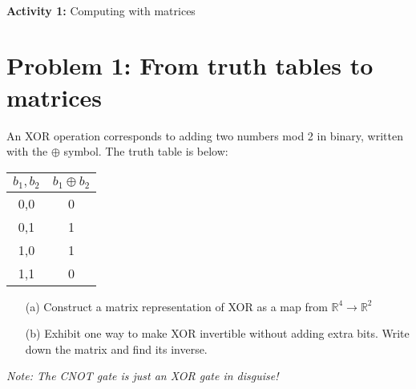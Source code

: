 \documentclass{article}
\begin{document}
\\
{\large \textbf{Activity 1:} Computing with matrices}\\

\section*{Problem 1: From truth tables to matrices}
An XOR operation corresponds to adding two numbers mod 2 in binary, written with the $\oplus$ symbol. The truth table is below:
\begin{table}[hbt!]
\centering
\begin{tabular}{c|c}
    $b_1,b_2$ & $b_1 \oplus b_2$ \\
    \hline
    0,0 & 0\\
    0,1 & 1\\
    1,0 & 1\\
    1,1 & 0\\
\end{tabular}
\end{table}
\begin{itemize}
\item[(a)] Construct a matrix representation of XOR as a map from $\mathbb R^4 \to \mathbb R^2$
\item[(b)] Exhibit one way to make XOR invertible without adding extra bits. Write down the matrix and find its inverse.
\end{itemize}
\textit{Note: The CNOT gate is just an XOR gate in disguise!}
\end{document}

